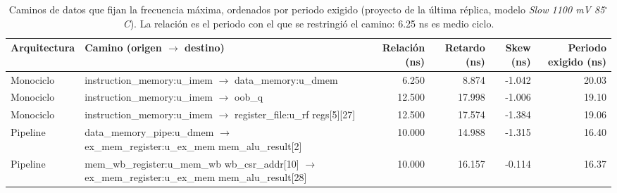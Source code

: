 \begin{table}[htbp]
\centering
\small
\caption{Caminos de datos que fijan la frecuencia máxima, ordenados por periodo exigido (proyecto de la última réplica, modelo \emph{Slow 1100 mV 85$^\circ$C}). La relación es el periodo con el que se restringió el camino: 6.25 ns es medio ciclo.}
\label{tab:critical_path}
\begin{tabular}{llrrrr}
\toprule
Arquitectura & Camino (origen $\to$ destino) & Relación (ns) & Retardo (ns) & Skew (ns) & Periodo exigido (ns) \\
\midrule
Monociclo & instruction\_memory:u\_imem $\to$ data\_memory:u\_dmem & 6.250 & 8.874 & -1.042 & 20.03 \\
Monociclo & instruction\_memory:u\_imem $\to$ oob\_q & 12.500 & 17.998 & -1.006 & 19.10 \\
Monociclo & instruction\_memory:u\_imem $\to$ register\_file:u\_rf regs[5][27] & 12.500 & 17.574 & -1.384 & 19.06 \\
\midrule
Pipeline & data\_memory\_pipe:u\_dmem $\to$ ex\_mem\_register:u\_ex\_mem mem\_alu\_result[2] & 10.000 & 14.988 & -1.315 & 16.40 \\
Pipeline & mem\_wb\_register:u\_mem\_wb wb\_csr\_addr[10] $\to$ ex\_mem\_register:u\_ex\_mem mem\_alu\_result[28] & 10.000 & 16.157 & -0.114 & 16.37 \\
\bottomrule
\end{tabular}
\end{table}
